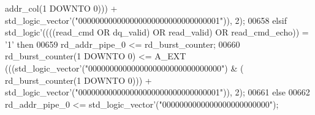 \begin{DoxyCode}
{      addr_col}\textcolor{vhdlchar}{(}\textcolor{vhdllogic}{}\textcolor{vhdllogic}{1} \textcolor{keywordflow}{DOWNTO} \textcolor{vhdllogic}{}\textcolor{vhdllogic}{0}\textcolor{vhdlchar}{)}\textcolor{vhdlchar}{)}\textcolor{vhdlchar}{)} \textcolor{vhdlchar}{+} \textcolor{comment}{std\_logic\_vector}\textcolor{vhdlchar}{'}\textcolor{vhdlchar}{(}\textcolor{vhdllogic}{"000000000000000000000000000000001"}\textcolor{vhdlchar}{)}\textcolor{vhdlchar}{)}\textcolor{vhdlchar}{,} \textcolor{vhdllogic}{}\textcolor{vhdllogic}{2}\textcolor{vhdlchar}{)};
00658       \textcolor{keywordflow}{elsif} \textcolor{comment}{std\_logic}\textcolor{vhdlchar}{'}\textcolor{vhdlchar}{(}\textcolor{vhdlchar}{(}\textcolor{vhdlchar}{(}\textcolor{vhdlchar}{(}\textcolor{vhdlchar}{read_cmd} \textcolor{keywordflow}{OR} \textcolor{vhdlchar}{dq_valid}\textcolor{vhdlchar}{)} \textcolor{keywordflow}{OR} \textcolor{vhdlchar}{read_valid}\textcolor{vhdlchar}{)} \textcolor{keywordflow}{OR} \textcolor{vhdlchar}{read_cmd_echo}\textcolor{vhdlchar}{)}\textcolor{vhdlchar}{)} \textcolor{vhdlchar}{=} \textcolor{vhdlchar}{'}\textcolor{vhdllogic}{}\textcolor{vhdllogic}{1}\textcolor{vhdlchar}{'} \textcolor{keywordflow}{then} 
00659         \textcolor{vhdlchar}{rd_addr_pipe_0} \textcolor{vhdlchar}{<=} \textcolor{vhdlchar}{rd_burst_counter};
00660         \textcolor{vhdlchar}{rd_burst_counter}\textcolor{vhdlchar}{(}\textcolor{vhdllogic}{}\textcolor{vhdllogic}{1} \textcolor{keywordflow}{DOWNTO} \textcolor{vhdllogic}{}\textcolor{vhdllogic}{0}\textcolor{vhdlchar}{)} \textcolor{vhdlchar}{<=} \textcolor{vhdlchar}{A\_EXT} \textcolor{vhdlchar}{(}\textcolor{vhdlchar}{(}\textcolor{vhdlchar}{(}\textcolor{comment}{std\_logic\_vector}\textcolor{vhdlchar}{'}\textcolor{vhdlchar}{(}\textcolor{vhdllogic}{"0000000000000000000000000000000"}\textcolor{vhdlchar}{)} \textcolor{vhdlchar}{&} \textcolor{vhdlchar}{(}\textcolor{vhdlchar}{
      rd_burst_counter}\textcolor{vhdlchar}{(}\textcolor{vhdllogic}{}\textcolor{vhdllogic}{1} \textcolor{keywordflow}{DOWNTO} \textcolor{vhdllogic}{}\textcolor{vhdllogic}{0}\textcolor{vhdlchar}{)}\textcolor{vhdlchar}{)}\textcolor{vhdlchar}{)} \textcolor{vhdlchar}{+} \textcolor{comment}{std\_logic\_vector}\textcolor{vhdlchar}{'}\textcolor{vhdlchar}{(}\textcolor{vhdllogic}{"000000000000000000000000000000001"}\textcolor{vhdlchar}{)}\textcolor{vhdlchar}{)}\textcolor{vhdlchar}{,} \textcolor{vhdllogic}{}\textcolor{vhdllogic}{2}\textcolor{vhdlchar}{)};
00661       \textcolor{keywordflow}{else}
00662         \textcolor{vhdlchar}{rd_addr_pipe_0} \textcolor{vhdlchar}{<=} \textcolor{comment}{std\_logic\_vector}\textcolor{vhdlchar}{'}\textcolor{vhdlchar}{(}\textcolor{vhdllogic}{"0000000000000000000000000"}\textcolor{vhdlchar}{)};

\end{DoxyCode}

